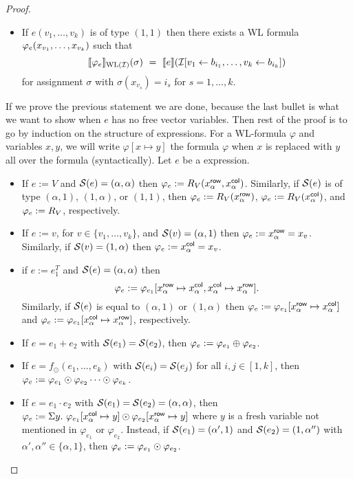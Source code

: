 \begin{proof}
\begin{itemize}
	\item If $e(v_1,\ldots,v_k)$ is of type $(1,1)$ then there exists a WL formula $\varphi_e( x_{v_1}, \ldots, x_{v_k})$ such that
	$$
	\ssem{\varphie}{\text{WL}(\I)}(\sigma) \ = \ \sem{e}{\I[v_1\gets b_{i_1},\ldots,v_k\gets b_{i_k}]}
	$$
	for assignment $\sigma$ with $\sigma(x_{v_s})=i_s$ for $s=1,\ldots, k$.
\end{itemize}
If we prove the previous statement we are done, because the last bullet is what we want to show when $e$ has no free vector variables. 
Then rest of the proof is to go by induction on the structure of \langprod expressions.
For a WL-formula $\varphi$ and \langprod variables $x,y$, we will write  $\varphi[x \mapsto y]$ the formula $\varphi$ when $x$ is replaced with $y$ all over the formula (syntactically).
Let $e$ be a \langprod expression.
\begin{itemize} \itemsep3mm
  \item If $e:=V$ and $\mathcal{S}(e)= (\alpha, \alpha)$ then $\varphi_e:=R_V(x_{\alpha}^{\mathsf{row}}, x_{\alpha}^{\mathsf{col}})$. Similarly, if $\mathcal{S}(e)$ is of type $(\alpha,1)$, $(1, \alpha)$, or $(1,1)$, then $\varphi_e:=R_V(x_{\alpha}^{\mathsf{row}})$, $\varphi_e:=R_V(x_{\alpha}^{\mathsf{col}})$, and $\varphi_e:=R_V$, respectively.
  
  \item If $e:=v$, for $v\in \{v_1,\ldots ,v_k\}$, and $\mathcal{S}(v)= (\alpha,1)$ then $\varphi_e := x_{\alpha}^{\mathsf{row}} = x_v$. Similarly, if $\mathcal{S}(v)= (1,\alpha)$ then $\varphi_e := x_{\alpha}^{\mathsf{col}} = x_v$.
  
  \item if $e:= e_1^T$ and $\mathcal{S}(e)=(\alpha,\alpha)$ then
  $$
  \varphi_e:= \varphi_{e_1}[x_{\alpha}^{\mathsf{row}} \mapsto x_{\alpha}^{\mathsf{col}}, x_{\alpha}^{\mathsf{col}} \mapsto x_{\alpha}^{\mathsf{row}}].
  $$
  Similarly, if $\mathcal{S}(e)$ is equal to $(\alpha,1)$ or $(1,\alpha)$ then $\varphi_e:=\varphi_{e_1}[x_{\alpha}^{\mathsf{row}} \mapsto x_{\alpha}^{\mathsf{col}}]$ and $\varphi_e:=\varphi_{e_1}[x_{\alpha}^{\mathsf{col}} \mapsto x_{\alpha}^{\mathsf{row}}]$, respectively.   


	\item If $e=e_1+e_2$ with $\mathcal{S} (e_1)=\mathcal{S} (e_2)$, then $\varphi_e:= \varphi_{e_1} \oplus \varphi_{e_2}$.
	
	\item If $e=f_\odot(e_1,\ldots, e_k)$ with $\mathcal{S}(e_i)=\mathcal{S}(e_j)$ for all $i,j\in[1,k]$, then $\varphi_e:= \varphi_{e_1} \odot \varphi_{e_2} \cdots \odot \varphi_{e_k}$.
	
	\item If $e=e_1\cdot e_2$ with $\mathcal{S} (e_1)=\mathcal{S} (e_2)=(\alpha, \alpha)$,  then $\varphi_e:= \Sigma y. \  \varphi_{e_1}[x_{\alpha}^{\mathsf{col}} \mapsto y] \odot \varphi_{e_2}[x_{\alpha}^{\mathsf{row}} \mapsto y]$ where $y$ is a fresh variable not mentioned in $\varphi_{e_1}$ or $\varphi_{e_2}$. Instead, if $\mathcal{S} (e_1)= (\alpha', 1)$ and $\mathcal{S} (e_2)=(1, \alpha'')$ with $\alpha', \alpha'' \in \{\alpha, 1\}$, then $\varphi_e := \varphi_{e_1} \odot \varphi_{e_2}$.
	

\end{itemize}
\end{proof}
